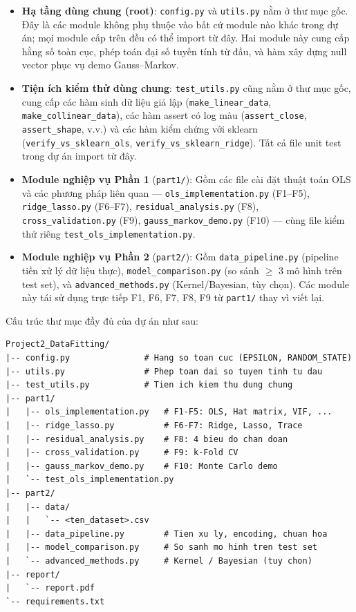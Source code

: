 \begin{itemize}
    \item \textbf{Hạ tầng dùng chung (root)}: \texttt{config.py} và \texttt{utils.py} nằm ở thư mục gốc. Đây là các module không phụ thuộc vào bất cứ module nào khác trong dự án; mọi module cấp trên đều có thể import từ đây. Hai module này cung cấp hằng số toàn cục, phép toán đại số tuyến tính từ đầu, và hàm xây dựng null vector phục vụ demo Gauss--Markov.
    \item \textbf{Tiện ích kiểm thử dùng chung}: \texttt{test\_utils.py} cũng nằm ở thư mục gốc, cung cấp các hàm sinh dữ liệu giả lập (\texttt{make\_linear\_data}, \texttt{make\_collinear\_data}), các hàm assert có log màu (\texttt{assert\_close}, \texttt{assert\_shape}, v.v.) và các hàm kiểm chứng với sklearn (\texttt{verify\_vs\_sklearn\_ols}, \texttt{verify\_vs\_sklearn\_ridge}). Tất cả file unit test trong dự án import từ đây.
    \item \textbf{Module nghiệp vụ Phần 1} (\texttt{part1/}): Gồm các file cài đặt thuật toán OLS và các phương pháp liên quan --- \texttt{ols\_implementation.py} (F1--F5), \texttt{ridge\_lasso.py} (F6--F7), \texttt{residual\_analysis.py} (F8), \texttt{cross\_validation.py} (F9), \texttt{gauss\_markov\_demo.py} (F10) --- cùng file kiểm thử riêng \texttt{test\_ols\_implementation.py}.
    \item \textbf{Module nghiệp vụ Phần 2} (\texttt{part2/}): Gồm \texttt{data\_pipeline.py} (pipeline tiền xử lý dữ liệu thực), \texttt{model\_comparison.py} (so sánh \(\ge\) 3 mô hình trên test set), và \texttt{advanced\_methods.py} (Kernel/Bayesian, tùy chọn). Các module này tái sử dụng trực tiếp F1, F6, F7, F8, F9 từ \texttt{part1/} thay vì viết lại.
\end{itemize}

Cấu trúc thư mục đầy đủ của dự án như sau:

\begin{tcolorbox}[mycodebox]
\begin{verbatim}
Project2_DataFitting/
|-- config.py               # Hang so toan cuc (EPSILON, RANDOM_STATE)
|-- utils.py                # Phep toan dai so tuyen tinh tu dau
|-- test_utils.py           # Tien ich kiem thu dung chung
|-- part1/
|   |-- ols_implementation.py   # F1-F5: OLS, Hat matrix, VIF, ...
|   |-- ridge_lasso.py          # F6-F7: Ridge, Lasso, Trace
|   |-- residual_analysis.py    # F8: 4 bieu do chan doan
|   |-- cross_validation.py     # F9: k-Fold CV
|   |-- gauss_markov_demo.py    # F10: Monte Carlo demo
|   `-- test_ols_implementation.py
|-- part2/
|   |-- data/
|   |   `-- <ten_dataset>.csv
|   |-- data_pipeline.py        # Tien xu ly, encoding, chuan hoa
|   |-- model_comparison.py     # So sanh mo hinh tren test set
|   `-- advanced_methods.py     # Kernel / Bayesian (tuy chon)
|-- report/
|   `-- report.pdf
`-- requirements.txt
\end{verbatim}
\end{tcolorbox}

